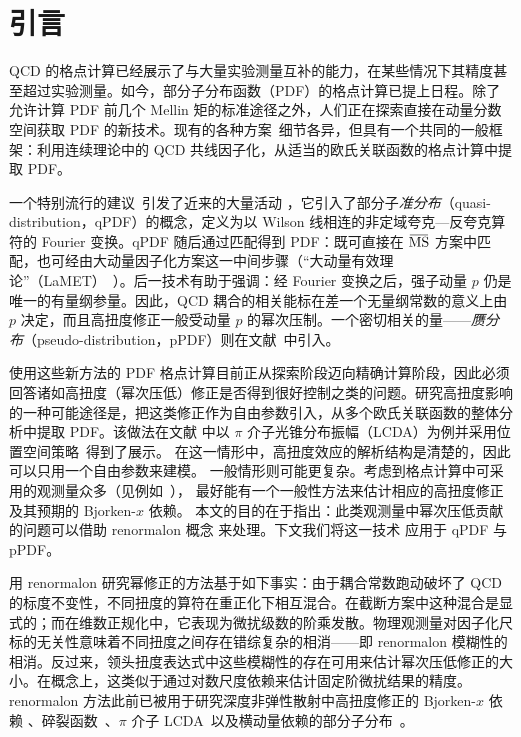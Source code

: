 \section{引言}\label{sect_introduction1}%
%

QCD 的格点计算已经展示了与大量实验测量互补的能力，在某些情况下其精度甚至超过实验测量。如今，部分子分布函数（PDF）的格点计算已提上日程。除了允许计算 PDF 前几个 Mellin 矩的标准途径之外，人们正在探索直接在动量分数空间获取 PDF 的新技术。现有的各种方案~\cite{Aglietti:1998ur,Abada:2001if,Detmold:2005gg,Braun:2007wv,Ji:2013dva,Ma:2017pxb}细节各异，但具有一个共同的一般框架：利用连续理论中的 QCD 共线因子化，从适当的欧氏关联函数的格点计算中提取 PDF。

一个特别流行的建议~\cite{Ji:2013dva}引发了近来的大量活动 \cite{Lin:2014zya,Alexandrou:2015rja,Chen:2016utp,Alexandrou:2016jqi,Lin:2017ani,Zhang:2017bzy,Chen:2017gck,Chen:2017mzz,Alexandrou:2017huk, Alexandrou:2018pbm,Chen:2018xof,Chen:2018fwa,Alexandrou:2018eet,
Lin:2018qky}，它引入了部分子\emph{准分布}（quasi-distribution，qPDF）的概念，定义为以 Wilson 线相连的非定域夸克—反夸克算符的 Fourier 变换。qPDF 随后通过匹配得到 PDF：既可直接在 $\MSbar$ 方案中匹配，也可经由大动量因子化方案这一中间步骤（``大动量有效理论''（LaMET）~\cite{Ji:2014gla,Izubuchi:2018srq}）。后一技术有助于强调：经 Fourier 变换之后，强子动量 $p$ 仍是唯一的有量纲参量。因此，QCD 耦合的相关能标在差一个无量纲常数的意义上由 $p$ 决定，而且高扭度修正一般受动量 $p$ 的幂次压制。一个密切相关的量——\emph{赝分布}（pseudo-distribution，pPDF）则在文献~\cite{Radyushkin:2017cyf,Orginos:2017kos,Karpie:2017bzm}中引入。

使用这些新方法的 PDF 格点计算目前正从探索阶段迈向精确计算阶段，因此必须回答诸如高扭度（幂次压低）修正是否得到很好控制之类的问题。研究高扭度影响的一种可能途径是，把这类修正作为自由参数引入，从多个欧氏关联函数的整体分析中提取 PDF。该做法在文献 \cite{Bali:2018spj} 中以 $\pi$ 介子光锥分布振幅（LCDA）为例并采用位置空间策略~\cite{Braun:2007wv,Bali:2017gfr}得到了展示。
%
在这一情形中，高扭度效应的解析结构是清楚的，因此可以只用一个自由参数来建模。
一般情形则可能更复杂。考虑到格点计算中可采用的观测量众多（见例如~\cite{Ma:2017pxb}），
最好能有一个一般性方法来估计相应的高扭度修正及其预期的 Bjorken-$x$ 依赖。
本文的目的在于指出：此类观测量中幂次压低贡献的问题可以借助 renormalon 概念 \cite{Beneke:1998ui,Beneke:2000kc}来处理。下文我们将这一技术
应用于 qPDF 与 pPDF。

用 renormalon 研究幂修正的方法基于如下事实：由于耦合常数跑动破坏了 QCD 的标度不变性，不同扭度的算符在重正化下相互混合。在截断方案中这种混合是显式的；而在维数正规化中，它表现为微扰级数的阶乘发散。物理观测量对因子化尺标的无关性意味着不同扭度之间存在错综复杂的相消——即 renormalon 模糊性的相消。反过来，领头扭度表达式中这些模糊性的存在可用来估计幂次压低修正的大小。在概念上，这类似于通过对数尺度依赖来估计固定阶微扰结果的精度。renormalon 方法此前已被用于研究深度非弹性散射中高扭度修正的 Bjorken-$x$ 依赖 \cite{Beneke:1995pq,Dokshitzer:1995qm,Dasgupta:1996hh}、碎裂函数~\cite{Dasgupta:1996ki,Beneke:1997sr}、$\pi$ 介子 LCDA~\cite{Braun:2004bu}以及横动量依赖的部分子分布~\cite{Scimemi:2016ffw}。

